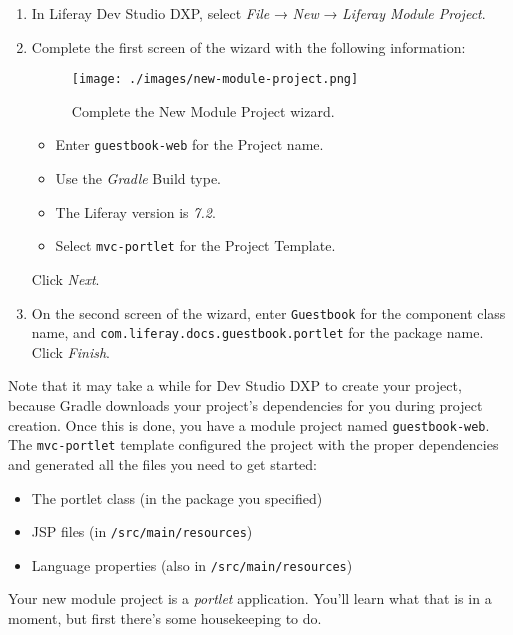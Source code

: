 \begin{enumerate}
\def\labelenumi{\arabic{enumi}.}
\item
  In Liferay Dev Studio DXP, select \emph{File} → \emph{New} →
  \emph{Liferay Module Project}.
\item
  Complete the first screen of the wizard with the following
  information:

  \begin{figure}
  \centering
  \texttt{[image: ./images/new-module-project.png]}
  \caption{Complete the New Module Project wizard.}
  \end{figure}

  \begin{itemize}
  \tightlist
  \item
    Enter \texttt{guestbook-web} for the Project name.
  \item
    Use the \emph{Gradle} Build type.
  \item
    The Liferay version is \emph{7.2}.
  \item
    Select \texttt{mvc-portlet} for the Project Template.
  \end{itemize}

  Click \emph{Next}.
\item
  On the second screen of the wizard, enter \texttt{Guestbook} for the
  component class name, and \texttt{com.liferay.docs.guestbook.portlet}
  for the package name. Click \emph{Finish}.
\end{enumerate}

Note that it may take a while for Dev Studio DXP to create your project,
because Gradle downloads your project's dependencies for you during
project creation. Once this is done, you have a module project named
\texttt{guestbook-web}. The \texttt{mvc-portlet} template configured the
project with the proper dependencies and generated all the files you
need to get started:

\begin{itemize}
\tightlist
\item
  The portlet class (in the package you specified)
\item
  JSP files (in \texttt{/src/main/resources})
\item
  Language properties (also in \texttt{/src/main/resources})
\end{itemize}

Your new module project is a \emph{portlet} application. You'll learn
what that is in a moment, but first there's some housekeeping to do.

